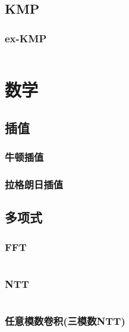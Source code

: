 \documentclass[a4paper]{article}
\begin{document}
\begin{multicols}{2}
			\subsection{KMP}
				

				\subsubsection{ex-KMP}
					\inputminted{cpp}{../src/字符串/exKMP.cpp}
			




		\section{数学}

			\subsection{插值}
				\subsubsection{牛顿插值}


				\subsubsection{拉格朗日插值}

			
			\subsection{多项式}
				\subsubsection{FFT}
					\inputminted{cpp}{../src/数学/FFT.cpp}

				\subsubsection{NTT}
					\inputminted{cpp}{../src/数学/NTT.cpp}

				\subsubsection{任意模数卷积(三模数NTT)}
					\inputminted{cpp}{../src/数学/任意模数卷积.cpp}


\end{multicols}
\end{document}
